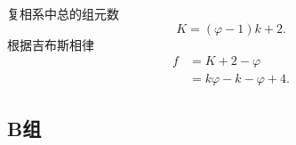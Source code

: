 \begin{questions}
\begin{solution}
{      复相系中总的组元数
      \begin{equation}
        K = (\varphi-1)k + 2.
      \end{equation}
      根据吉布斯相律
      \begin{equation}
        \begin{aligned}
          f & = K + 2 - \varphi            \\
            & = k\varphi - k -\varphi + 4.
        \end{aligned}
      \end{equation}}
  \end{solution}
\end{questions}
\subsection{B组}
